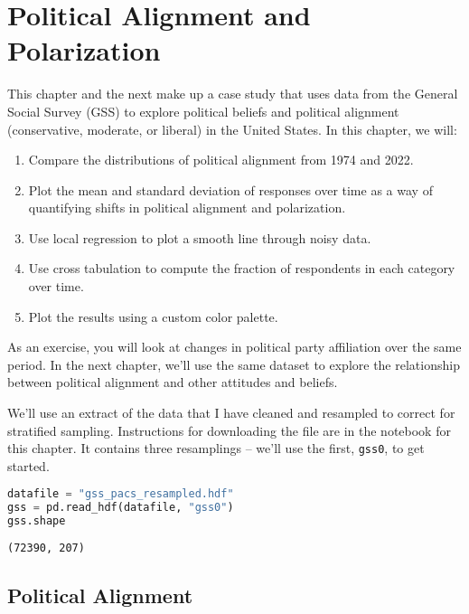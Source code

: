 \chapter{Political Alignment and
Polarization}\label{political-alignment-and-polarization}

This chapter and the next make up a case study that uses data from the
General Social Survey (GSS) to explore political beliefs and political
alignment (conservative, moderate, or liberal) in the United States. In
this chapter, we will:

\begin{enumerate}
\def\labelenumi{\arabic{enumi}.}
\item
  Compare the distributions of political alignment from 1974 and 2022.
\item
  Plot the mean and standard deviation of responses over time as a way
  of quantifying shifts in political alignment and polarization.
\item
  Use local regression to plot a smooth line through noisy data.
\item
  Use cross tabulation to compute the fraction of respondents in each
  category over time.
\item
  Plot the results using a custom color palette.
\end{enumerate}

As an exercise, you will look at changes in political party affiliation
over the same period. In the next chapter, we'll use the same dataset to
explore the relationship between political alignment and other attitudes
and beliefs.

We'll use an extract of the data that I have cleaned and resampled to
correct for stratified sampling. Instructions for downloading the file
are in the notebook for this chapter. It contains three resamplings --
we'll use the first, \passthrough{\lstinline!gss0!}, to get started.

\begin{lstlisting}[language=Python,style=source]
datafile = "gss_pacs_resampled.hdf"
gss = pd.read_hdf(datafile, "gss0")
gss.shape
\end{lstlisting}

\begin{lstlisting}[style=output]
(72390, 207)
\end{lstlisting}

\section{Political Alignment}\label{political-alignment}

